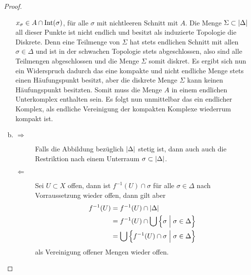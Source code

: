 \begin{Satz}
\begin{proof}
\begin{enumerate}[(a)]
            $x_\sigma \in A \cap \operatorname{Int}(\sigma)$, für alle $\sigma$ mit
            nichtleeren Schnitt mit $A$. Die Menge
            $\Sigma \subset \left| \Delta \right|$ all dieser Punkte ist nicht
            endlich und besitzt als induzierte Topologie die
            Diskrete. Denn eine Teilmenge von $\Sigma$ hat stets
            endlichen Schnitt mit allen $\sigma \in \Delta$ und ist in
            der schwachen Topologie stets abgeschlossen, also sind
            alle Teilmengen abgeschlossen und die Menge $\Sigma$ somit
            diskret.
            Es ergibt sich nun ein Widerspruch dadurch das eine
            kompakte und nicht endliche Menge stets einen
            Häufungspunkt besitzt, aber die diskrete Menge $\Sigma$
            kann keinen Häufungspunkt besitzten.
            Somit muss die Menge $A$ in einem endlichen Unterkomplex
            enthalten sein. Es folgt nun unmittelbar das ein endlicher
            Komplex, als endliche Vereinigung der kompakten Komplexe
            wiederrum kompakt ist.
          \item 
            \begin{description}
            \item[\glqq $\Rightarrow$\grqq] Falls die Abbildung
              bezüglich $\left| \Delta \right|$ stetig ist, dann auch auch die
              Restriktion nach einem Unterraum
              $\sigma \subset \left| \Delta \right|$.
            \item[\glqq $\Leftarrow$ \grqq] Sei $U \subset X$ offen,
              dann ist $f^{-1}(U) \cap \sigma$ für alle
              $\sigma \in \Delta$ nach Vorraussetzung wieder offen,
              dann gilt aber
              \begin{align*}
                f^{-1}(U) &= f^{-1} (U) \cap \gr{\Delta} \\ 
                          &= f^{-1} (U) \cap \bigcup \set{\sigma }%
                            { \sigma \in \Delta} \\ 
                          &= \bigcup \set{ f^{-1}(U) \cap \sigma }%
                            { \sigma \in \Delta}
              \end{align*}
              als Vereinigung offener Mengen wieder offen.
            \end{description}
          \end{enumerate}
	\end{proof}
\end{Satz}

